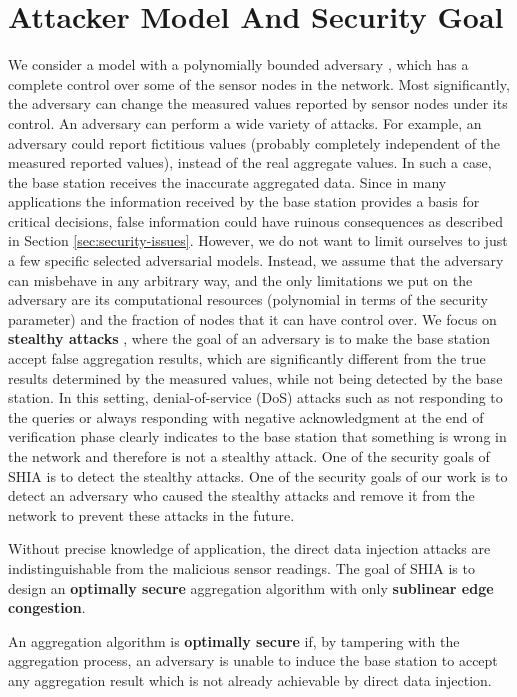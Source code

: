 \section{Attacker Model And Security Goal}
	We consider a model with a polynomially bounded adversary \cite{przydatek2003sia}, which has a complete control over some of the sensor nodes in the network.
	Most significantly, the adversary can change the measured values reported by sensor nodes under its control.
	An adversary can perform a wide variety of attacks.
	For example, an adversary could report fictitious values (probably completely independent of the measured reported values), instead of the real aggregate values.
	In such a case, the base station receives the inaccurate aggregated data. 
	Since in many applications the information received by the base station provides a basis for critical decisions, false information could have ruinous consequences as described in Section \ref{sec:security-issues}.
	However, we do not want to limit ourselves to just a few specific selected adversarial models. 
	Instead, we assume that the adversary can misbehave in any arbitrary way, and the only limitations we put on the adversary are its computational resources (polynomial in terms of the security parameter) and the fraction of nodes that it can have control over. 
	We focus on \textbf{stealthy attacks} \cite{przydatek2003sia}, where the goal of an adversary is to make the base station accept false aggregation results, which are significantly different from the true results determined by the measured values, while not being detected by the base station.
	In this setting, denial-of-service (DoS) attacks such as not responding to the queries or always responding with negative acknowledgment at the end of verification phase clearly indicates to the base station that something is wrong in the network and therefore is not a stealthy attack.
	One of the security goals of SHIA is to detect the stealthy attacks.
	One of the security goals of our work is to detect an adversary who caused the stealthy attacks and remove it from the network to prevent these attacks in the future.
	
	Without precise knowledge of application, the direct data injection attacks are indistinguishable from the malicious sensor readings.
	The goal of SHIA is to design an \textbf{optimally secure} aggregation algorithm with only \textbf{sublinear edge congestion}.
	\begin{definition}
		\label{def:optimally-secure}
		\cite{chan2006secure} An aggregation algorithm is \textbf{optimally secure} if, by tampering with the aggregation process, an adversary is unable to induce the base station to accept any aggregation result which is not already achievable by direct data injection.
	\end{definition}


